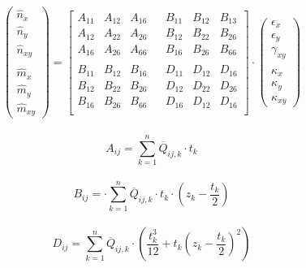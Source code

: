 \begin{equation}
\begin{pmatrix}
		\hat{n}_{x}\\
	\hat{n}_{y}\\
	\hat{n}_{xy}\\
	\\
	\hat{m}_{x}\\
	\hat{m}_{y}\\
	\hat{m}_{xy}
\end{pmatrix}
=\begin{bmatrix}
	A_{11}&A_{12}&A_{16}&&B_{11}&B_{12}&B_{13}\\
	A_{12}&A_{22}&A_{26}&&B_{12}&B_{22}&B_{26}\\
	A_{16}&A_{26}&A_{66}&&B_{16}&B_{26}&B_{66}\\
	\\
	B_{11}&B_{12}&B_{16}&&D_{11}&D_{12}&D_{16}\\
	B_{12}&B_{22}&B_{26}&&D_{12}&D_{22}&D_{26}\\
	B_{16}&B_{26}&B_{66}&&D_{16}&D_{12}&D_{16}\\
\end{bmatrix}
\cdot \begin{pmatrix}
	\epsilon_{x}\\
	\epsilon_{y}\\
	\gamma_{xy}\\
	\\
	\kappa_{x}\\
	\kappa_{y}\\
	\kappa_{xy}
\end{pmatrix}
\end{equation}\\

\begin{equation}
	A_{ij}= \sum_{k=1}^{n} \overline{Q}_{ij,k}\cdot t_{k}
\end{equation}\\

\begin{equation}
	B_{ij}= \cdot \sum_{k=1}^{n} \overline{Q}_{ij,k}\cdot t_{k}\cdot \left(z_{k}-\frac{t_{k}}{2}\right)
\end{equation}\\

\begin{equation}
	D_{ij}=\sum_{k=1}^{n} \overline{Q}_{ij,k}\cdot \left(\frac{t_{k}^{3}}{12}+t_{k}\left(z_{k}-\frac{t_{k}}{2}\right)^{2}\right)
\end{equation}

